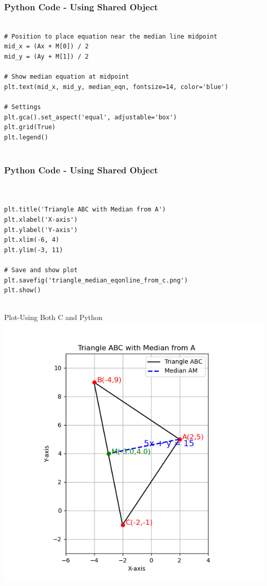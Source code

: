 \documentclass{beamer}
\numberwithin{equation}{section}
\begin{document}
\begin{frame}[fragile]
    \frametitle{Python Code - Using Shared Object}
    \begin{lstlisting}

# Position to place equation near the median line midpoint
mid_x = (Ax + M[0]) / 2
mid_y = (Ay + M[1]) / 2

# Show median equation at midpoint
plt.text(mid_x, mid_y, median_eqn, fontsize=14, color='blue')

# Settings
plt.gca().set_aspect('equal', adjustable='box')
plt.grid(True)
plt.legend()


\end{lstlisting}
\end{frame}
\begin{frame}[fragile]
    \frametitle{Python Code - Using Shared Object}
    \begin{lstlisting}


plt.title('Triangle ABC with Median from A')
plt.xlabel('X-axis')
plt.ylabel('Y-axis')
plt.xlim(-6, 4)
plt.ylim(-3, 11)

# Save and show plot
plt.savefig('triangle_median_eqonline_from_c.png')
plt.show()


\end{lstlisting}
\end{frame}


\begin{frame}{Plot-Using Both C and Python}
    \centering
    \includegraphics[width=\columnwidth, height=0.8\textheight, keepaspectratio]{FIG/fig2.png}     
\end{frame}
\end{document}
